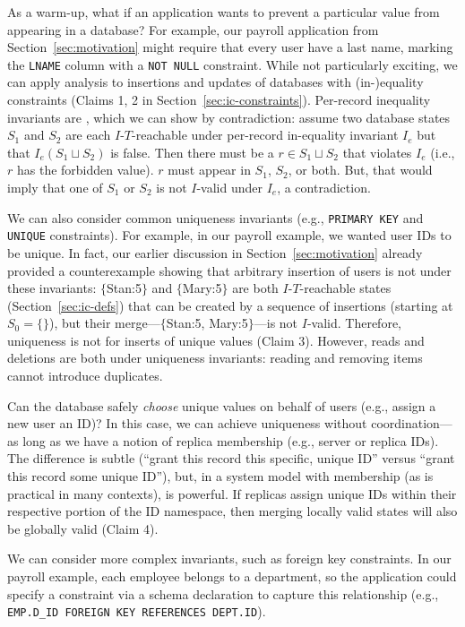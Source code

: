  As a warm-up, what if an application wants to
prevent a particular value from appearing in a database? For example,
our payroll application from Section~\ref{sec:motivation} might
require that every user have a last name, marking the \texttt{LNAME}
column with a \texttt{NOT NULL} constraint. While not particularly
exciting, we can apply \iconfluence analysis to insertions and updates
of databases with (in-)equality constraints (Claims 1, 2 in
Section~\ref{sec:ic-constraints}). Per-record inequality invariants are
\iconfluent, which we can show by contradiction: assume two database
states $S_1$ and $S_2$ are each $I$-$T$-reachable under per-record
in-equality invariant $I_e$ but that $I_e(S_1 \sqcup S_2)$ is
false. Then there must be a $r \in S_1 \sqcup S_2$ that violates $I_e$
(i.e., $r$ has the forbidden value). $r$ must appear in $S_1$, $S_2$,
or both. But, that would imply that one of $S_1$ or $S_2$ is not
$I$-valid under $I_e$, a contradiction.

 We can also consider common uniqueness
invariants (e.g., \texttt{PRIMARY KEY} and \texttt{UNIQUE}
constraints). For example, in our payroll example, we wanted user IDs
to be unique. In fact, our earlier discussion in
Section~\ref{sec:motivation} already provided a counterexample showing
that arbitrary insertion of users is not \iconfluent under these
invariants: $\{$Stan:5$\}$ and $\{$Mary:5$\}$ are both
$I$-$T$-reachable states (Section~\ref{sec:ic-defs}) that can be
created by a sequence of insertions (starting at $S_0=\{\}$), but
their merge---$\{$Stan:5, Mary:5$\}$---is not $I$-valid. Therefore,
uniqueness is not \iconfluent for inserts of unique values (Claim
3). However, reads and deletions are both \iconfluent under uniqueness
invariants: reading and removing items cannot introduce duplicates.

Can the database safely \textit{choose} unique values on behalf of
users (e.g., assign a new user an ID)? In this case, we can achieve
uniqueness without coordination---as long as we have a notion of
replica membership (e.g., server or replica IDs). The difference is
subtle (``grant this record this specific, unique ID'' versus ``grant
this record some unique ID''), but, in a system model
with membership (as is practical in many contexts), is powerful. If
replicas assign unique IDs within their respective portion of the ID
namespace, then merging locally valid states will also be globally
valid (Claim 4).

 We can consider more complex invariants, such
as foreign key constraints. In our payroll example, each employee
belongs to a department, so the application could specify a constraint
via a schema declaration to capture this relationship (e.g.,
\texttt{EMP.D\_ID FOREIGN KEY REFERENCES DEPT.ID}).

